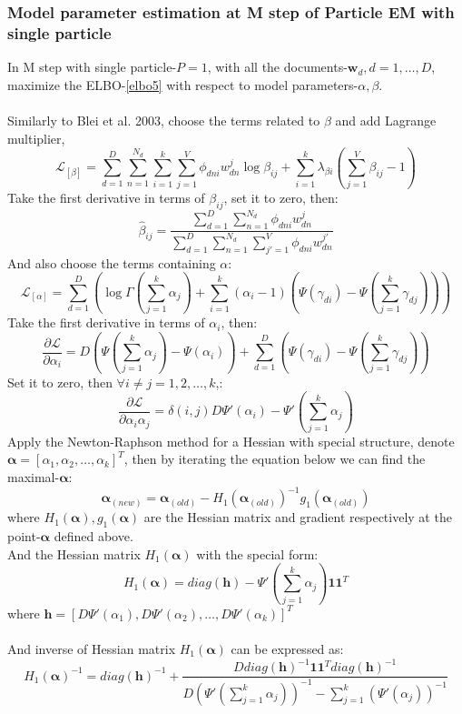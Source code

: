 \documentclass{article}
\newcommand{\bs}{\boldsymbol}
\newcommand{\Sum}{\displaystyle\sum}
\begin{document}
\subsubsection{Model parameter estimation at M step of Particle EM with single particle}
In M step with single particle-$P=1$, with all the documents-$\bs{w}_d,d=1,\ldots,D$, maximize the  ELBO-\ref{elbo5} with respect to model parameters-$\alpha,\beta$.\\
\\
Similarly to Blei et al. 2003, choose the terms related to $\beta$ and add Lagrange multiplier,\\
\[
\mathcal{L}_{[\beta]}=\Sum_{d=1}^{D}\Sum_{n=1}^{N_d}\Sum_{i=1}^{k}\Sum_{j=1}^{V}\phi_{dni}w_{dn}^j\log\beta_{ij}+\Sum_{i=1}^{k}\lambda_{\beta i}(\Sum_{j=1}^{V}\beta_{ij}-1)
\]
Take the first derivative in terms of $\beta_{ij}$, set it to zero, then:\\
\[
\hat{\beta}_{ij}=\frac{\sum_{d=1}^{D}\sum_{n=1}^{N_d}\phi_{dni}w_{dn}^j}{\sum_{d=1}^{D}\sum_{n=1}^{N_d}\sum_{j'=1}^{V}\phi_{dni}w_{dn}^{j'}}
\]
And also choose the terms containing $\alpha$:\\
\[
\mathcal{L}_{[\alpha]}=\Sum_{d=1}^{D}\left(\log\Gamma(\sum_{j=1}^{k}\alpha_j)+\Sum_{i=1}^{k}(\alpha_i-1)(\Psi(\gamma_{di})-\Psi(\sum_{j=1}^{k}\gamma_{dj}))\right)
\]
Take the first derivative in terms of $\alpha_{i}$,  then:\\
\[
\frac{\partial \mathcal{L}}{\partial \alpha_{i} }=D(\Psi(\sum_{j=1}^{k}\alpha_j)-\Psi(\alpha_i))+\Sum_{d=1}^{D}(\Psi(\gamma_{di})-\Psi(\sum_{j=1}^{k}\gamma_{dj}))
\]
Set it to zero, then $\forall i\neq j=1,2,\ldots,k$,:\\
\[
\frac{\partial \mathcal{L}}{\partial \alpha_{i}\alpha_{j} }=\delta(i,j)D\Psi'(\alpha_i)-\Psi'(\sum_{j=1}^{k}\alpha_j)
\]
Apply the Newton-Raphson method for a Hessian with special structure, denote $\bs{\alpha}=[\alpha_{1},\alpha_{2},\ldots,\alpha_{k}]^T$, then by iterating the equation below we can find the maximal-$\bs{\alpha}$:\\
\[
\bs{\alpha}_{(new)}=\bs{\alpha}_{(old)}-H_1(\bs{\alpha}_{(old)})^{-1}g_1(\bs{\alpha}_{(old)})
\]
where $H_1(\bs{\alpha}),g_1(\bs{\alpha})$ are the Hessian matrix and gradient respectively at the point-$\bs{\alpha}$ defined above.\\
And the Hessian matrix $H_1(\bs{\alpha})$ with the special form:\\
\[
H_1(\bs{\alpha})=diag(\bs{h})-\Psi'(\sum_{j=1}^{k}\alpha_j)\bs{1}\bs{1}^T
\]
where $\bs{h}=[D\Psi'(\alpha_1),D\Psi'(\alpha_2),\ldots,D\Psi'(\alpha_k)]^T$\\
\\
And inverse of Hessian matrix $H_1(\bs{\alpha})$ can be expressed as:\\
\[
H_1(\bs{\alpha})^{-1}=diag(\bs{h})^{-1}+\frac{Ddiag(\bs{h})^{-1}\bs{1}\bs{1}^Tdiag(\bs{h})^{-1}}{D(\Psi'(\sum_{j=1}^{k}\alpha_j))^{-1}-\sum_{j=1}^{k}(\Psi'(\alpha_j))^{-1}}
\]
\end{document}
